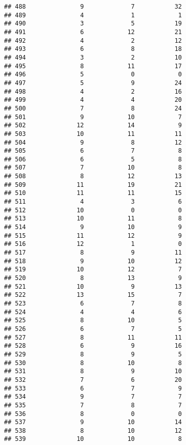 \documentclass[
]{article}
\begin{document}
\begin{verbatim}
## 488               9             7           32
## 489               4             1            1
## 490               3             5           19
## 491               6            12           21
## 492               4             2           12
## 493               6             8           18
## 494               3             2           10
## 495               8            11           17
## 496               5             0            0
## 497               5             9           24
## 498               4             2           16
## 499               4             4           20
## 500               7             8           24
## 501               9            10            7
## 502              12            14            9
## 503              10            11           11
## 504               9             8           12
## 505               6             7            8
## 506               6             5            8
## 507               7            10            8
## 508               8            12           13
## 509              11            19           21
## 510              11            11           15
## 511               4             3            6
## 512              10             0            0
## 513              10            11            8
## 514               9            10            9
## 515              11            12            9
## 516              12             1            0
## 517               8             9           11
## 518               9            10           12
## 519              10            12            7
## 520               8            13            9
## 521              10             9           13
## 522              13            15            7
## 523               6             7            8
## 524               4             4            6
## 525               8            10            5
## 526               6             7            5
## 527               8            11           11
## 528               6             9           16
## 529               8             9            5
## 530               8            10            8
## 531               8             9           10
## 532               7             6           20
## 533               6             7            9
## 534               9             7            7
## 535               7             8            7
## 536               8             0            0
## 537               9            10           14
## 538               8            10           12
## 539              10            10            8

\end{verbatim}
\end{document}
